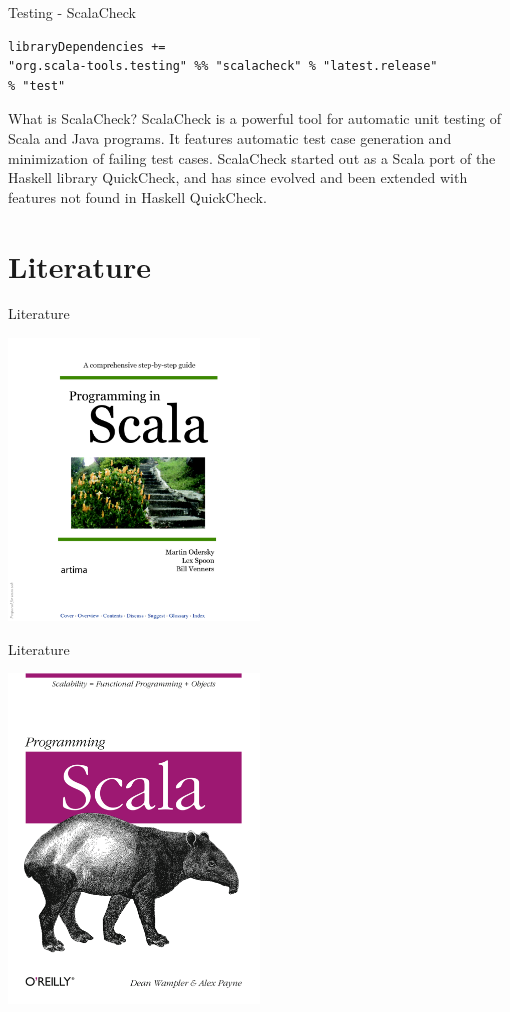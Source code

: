 \begin{frame}[fragile]{Testing - ScalaCheck}
\begin{center}
\end{center}
\begin{lstlisting}
libraryDependencies += 
"org.scala-tools.testing" %% "scalacheck" % "latest.release" 
% "test"
\end{lstlisting}
\begin{block}{What is ScalaCheck?}
ScalaCheck is a powerful tool for automatic unit testing of Scala and Java
programs. It features automatic test case generation and minimization of failing
test cases. ScalaCheck started out as a Scala port of the Haskell library
QuickCheck, and has since evolved and been extended with features not found in
Haskell QuickCheck.
\end{block}
\end{frame}

\section{Literature}
\begin{frame}{Literature}
\begin{center}
\includegraphics[width=0.5\textwidth]{resources/ProgrammingInScala.png}
\end{center}
\end{frame}
\begin{frame}{Literature}
\begin{center}
\includegraphics[width=0.5\textwidth]{resources/ProgrammingScala.png}
\end{center}
\end{frame}

